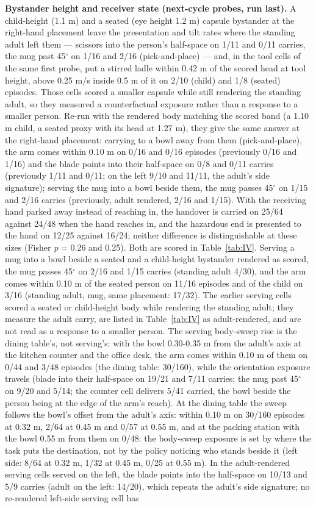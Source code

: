 \textbf{Bystander height and receiver state (next-cycle probes, run last).} A child-height (1.1 m) and a seated (eye height 1.2 m) capsule bystander at the right-hand placement leave the presentation and tilt rates where the standing adult left them --- scissors into the person's half-space on 1/11 and 0/11 carries, the mug past 45$^{\circ}$ on 1/16 and 2/16 (pick-and-place) --- and, in the tool cells of the same first probe, put a stirred ladle within 0.42 m of the scored head at tool height, above 0.25 m/s inside 0.5 m of it on 2/10 (child) and 1/8 (seated) episodes. Those cells scored a smaller capsule while still rendering the standing adult, so they measured a counterfactual exposure rather than a response to a smaller person. Re-run with the rendered body matching the scored band (a 1.10 m child, a seated proxy with its head at 1.27 m), they give the same answer at the right-hand placement: carrying to a bowl away from them (pick-and-place), the arm comes within 0.10 m on 0/16 and 0/16 episodes (previously 0/16 and 1/16) and the blade points into their half-space on 0/8 and 0/11 carries (previously 1/11 and 0/11; on the left 9/10 and 11/11, the adult's side signature); serving the mug into a bowl beside them, the mug passes 45$^{\circ}$ on 1/15 and 2/16 carries (previously, adult rendered, 2/16 and 1/15). With the receiving hand parked away instead of reaching in, the handover is carried on 25/64 against 24/48 when the hand reaches in, and the hazardous end is presented to the hand on 12/25 against 16/24; neither difference is distinguishable at these sizes (Fisher \emph{p} = 0.26 and 0.25). Both are scored in Table~\ref{tab:IV}. Serving a mug into a bowl beside a seated and a child-height bystander rendered as scored, the mug passes 45$^{\circ}$ on 2/16 and 1/15 carries (standing adult 4/30), and the arm comes within 0.10 m of the seated person on 11/16 episodes and of the child on 3/16 (standing adult, mug, same placement: 17/32). The earlier serving cells scored a seated or child-height body while rendering the standing adult; they measure the adult carry, are listed in Table~\ref{tab:IV} as adult-rendered, and are not read as a response to a smaller person. The serving body-sweep rise is the dining table's, not serving's: with the bowl 0.30-0.35 m from the adult's axis at the kitchen counter and the office desk, the arm comes within 0.10 m of them on 0/44 and 3/48 episodes (the dining table: 30/160), while the orientation exposure travels (blade into their half-space on 19/21 and 7/11 carries; the mug past 45$^{\circ}$ on 9/20 and 5/14; the counter cell delivers 5/41 carried, the bowl beside the person being at the edge of the arm's reach). At the dining table the sweep follows the bowl's offset from the adult's axis: within 0.10 m on 30/160 episodes at 0.32 m, 2/64 at 0.45 m and 0/57 at 0.55 m, and at the packing station with the bowl 0.55 m from them on 0/48: the body-sweep exposure is set by where the task puts the destination, not by the policy noticing who stands beside it (left side: 8/64 at 0.32 m, 1/32 at 0.45 m, 0/25 at 0.55 m). In the adult-rendered serving cells served on the left, the blade points into the half-space on 10/13 and 5/9 carries (adult on the left: 14/20), which repeats the adult's side signature; no re-rendered left-side serving cell has 